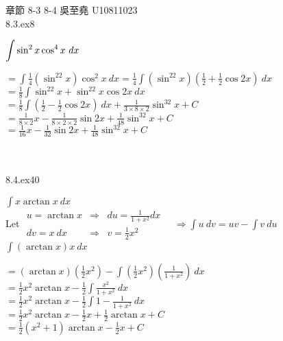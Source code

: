 \documentclass[12pt]{book}
\author{andersonwu2000}
\begin{document}
\begin{CJK}{UTF8}{bsmi}

\hfill 章節 8-3 8-4 吳至堯 U10811023 \\

8.3.ex8 \begin{minipage}[t]{\dimexpr\linewidth}
$\displaystyle\int \sin^2x\cos^4x\ dx\displaystyle$
\begin{minipage}[t]{\dimexpr\linewidth}
$\displaystyle=\int \frac{1}{4}(\sin^22x)\cos^2x\ dx=\frac{1}{4}\int (\sin^22x)(\frac{1}{2}+\frac{1}{2}\cos2x)\ dx$ \\
$\displaystyle=\frac{1}{8}\int \sin^22x+\sin^22x\cos2x\ dx$ \\
$\displaystyle=\frac{1}{8}\int (\frac{1}{2}-\frac{1}{2}\cos2x)\ dx+\frac{1}{3\times8\times2}\sin^32x+C$ \\
$\displaystyle=\frac{1}{8\times2}x-\frac{1}{8\times2\times2}\sin2x+\frac{1}{48}\sin^32x+C$ \\
$\displaystyle=\frac{1}{16}x-\frac{1}{32}\sin2x+\frac{1}{48}\sin^32x+C$
\end{minipage}
\end{minipage}\\\\

8.4.ex40 \begin{minipage}[t]{\dimexpr\linewidth}
$\displaystyle\int x\arctan x\ dx$ \\
Let $\displaystyle\begin{matrix}
u = \arctan x & \Rightarrow & du = \frac{1}{1+x^2}dx \\
dv = x\ dx & \Rightarrow & v=\frac{1}{2}x^2
\end{matrix}\quad\Rightarrow\int u\ dv=uv-\int v\ du$ \\
$\displaystyle\int(\arctan x)x\ dx$
\begin{minipage}[t]{\dimexpr\linewidth}
$\displaystyle=(\arctan x)(\frac{1}{2}x^2)-\int (\frac{1}{2}x^2)(\frac{1}{1+x^2})\ dx$ \\
$\displaystyle=\frac{1}{2}x^2\arctan x-\frac{1}{2}\int\frac{x^2}{1+x^2}\ dx$ \\
$\displaystyle=\frac{1}{2}x^2\arctan x-\frac{1}{2}\int1-\frac{1}{1+x^2}\ dx$ \\
$\displaystyle=\frac{1}{2}x^2\arctan x-\frac{1}{2}x+\frac{1}{2}\arctan x+C$ \\
$\displaystyle=\frac{1}{2}(x^2+1)\arctan x-\frac{1}{2}x+C$ \\
\end{minipage}
\end{minipage}\\

\end{CJK}
\end{document}
